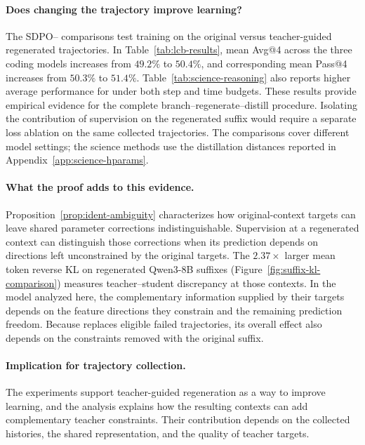 \paragraph{Does changing the trajectory improve learning?} The SDPO--\method{} comparisons test training on the original versus teacher-guided regenerated trajectories. In Table~\ref{tab:lcb-results}, mean Avg@4 across the three coding models increases from $49.2\%$ to $50.4\%$, and corresponding mean Pass@4 increases from $50.3\%$ to $51.4\%$. Table~\ref{tab:science-reasoning} also reports higher average performance for \method{} under both step and time budgets. These results provide empirical evidence for the complete branch--regenerate--distill procedure. Isolating the contribution of supervision on the regenerated suffix would require a separate loss ablation on the same collected trajectories. The comparisons cover different model settings; the science methods use the distillation distances reported in Appendix~\ref{app:science-hparams}.

\paragraph{What the proof adds to this evidence.} Proposition~\ref{prop:ident-ambiguity} characterizes how original-context targets can leave shared parameter corrections indistinguishable. Supervision at a regenerated context can distinguish those corrections when its prediction depends on directions left unconstrained by the original targets. The $2.37\times$ larger mean token reverse KL on regenerated Qwen3-8B suffixes (Figure~\ref{fig:suffix-kl-comparison}) measures teacher--student discrepancy at those contexts. In the model analyzed here, the complementary information supplied by their targets depends on the feature directions they constrain and the remaining prediction freedom. Because \method{} replaces eligible failed trajectories, its overall effect also depends on the constraints removed with the original suffix.


\paragraph{Implication for trajectory collection.} The experiments support teacher-guided regeneration as a way to improve learning, and the analysis explains how the resulting contexts can add complementary teacher constraints. Their contribution depends on the collected histories, the shared representation, and the quality of teacher targets.


